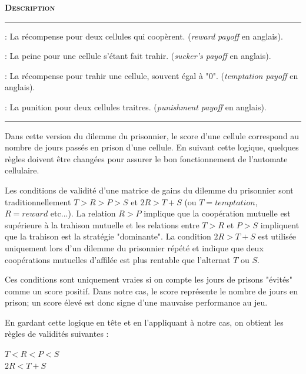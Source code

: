 \documentclass[a4paper]{article}
\begin{document}
\vspace{0.25cm}
\begin{description}[labelwidth=1.75cm]
    \small
    \item[\textbf{\textsc{Champ}}] \textbf{\textsc{Description}}
    \vspace{0.1cm}
    \hrule{}
    \item[\texttt{reward}] : La récompense pour deux cellules qui coopèrent. (\textit{reward payoff} en anglais).
    \item[\texttt{sucker}] : La peine pour une cellule s'étant fait trahir. (\textit{sucker's payoff} en anglais).
    \item[\texttt{temptation}] : La récompense pour trahir une cellule, souvent égal à "0". (\textit{temptation payoff} en anglais).
    \item[\texttt{punishment}] : La punition pour deux cellules traitres. (\textit{punishment payoff} en anglais).
\end{description}
\hrule{}
\vspace{0.5cm}

Dans cette version du dilemme du prisonnier, le score d'une cellule correspond au nombre de jours passés en prison d'une cellule. En suivant cette logique, quelques règles doivent être changées pour assurer le bon fonctionnement de l'automate cellulaire. 

Les conditions de validité d'une matrice de gains du dilemme du prisonnier sont traditionnellement $T > R > P > S$ et $2R > T + S$ (ou $T = temptation$, $R = reward$ etc...). La relation $R > P$ implique que la coopération mutuelle est supérieure à la trahison mutuelle et les relations entre $T > R$ et $P > S$ impliquent que la trahison est la stratégie "dominante". La condition $2R > T + S$ est utilisée uniquement lors d'un dilemme du prisonnier répété et indique que deux coopérations mutuelles d'affilée est plus rentable que l'alternat $T$ ou $S$. 

Ces conditions sont uniquement vraies si on compte les jours de prisons "évités" comme un score positif. Dans notre cas, le score représente le nombre de jours en prison; un score élevé est donc signe d'une mauvaise performance au jeu.

En gardant cette logique en tête et en l'appliquant à notre cas, on obtient les règles de validités suivantes :
\begin{framed}
    \centering
    $T < R < P < S$\\
    $2R < T + S$
\end{framed}
\end{document}
